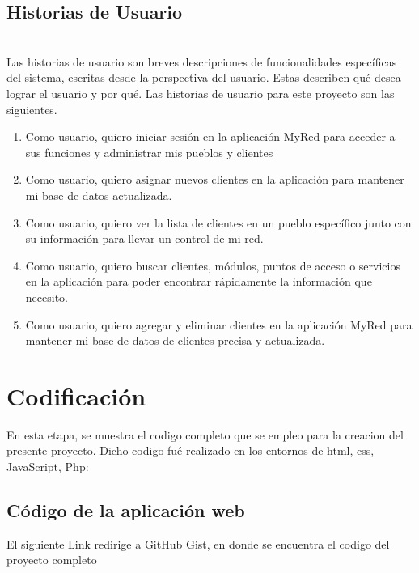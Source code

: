 \documentclass[a4paper,12pt]{article}
\begin{document}
\subsection{\textbf{Historias de Usuario}}\\
Las historias de usuario son breves descripciones de funcionalidades específicas del sistema, escritas desde la perspectiva del usuario. Estas describen qué desea lograr el usuario y por qué. Las historias de usuario para este proyecto son las siguientes. 
\begin{enumerate}
    \item Como usuario, quiero iniciar sesión en la aplicación MyRed para acceder a sus funciones y administrar mis pueblos y clientes\\
    \item Como usuario, quiero asignar nuevos clientes en la aplicación para mantener mi base de datos actualizada.\\
    \item Como usuario, quiero ver la lista de clientes en un pueblo específico junto con su información para llevar un control de mi red.\\
    \item  Como usuario, quiero buscar clientes, módulos, puntos de acceso o servicios en la aplicación para poder encontrar rápidamente la información que necesito.\\
    \item Como usuario, quiero agregar y eliminar clientes en la aplicación MyRed para mantener mi base de datos de clientes precisa y actualizada.\\
\end{enumerate}



\newpage
\section{Codificación}
En esta etapa, se muestra el codigo completo que se empleo para la creacion del presente proyecto. Dicho codigo fué realizado en los entornos de html, css, JavaScript, Php: \\

\subsection{Código de la aplicación web}
El siguiente Link redirige a GitHub Gist, en donde se encuentra el codigo del proyecto completo
\end{document}
